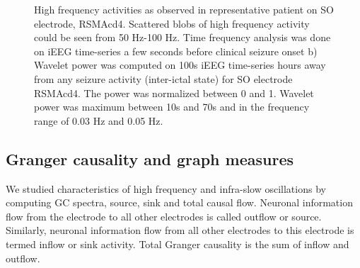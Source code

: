 \begin{figure}%
    \caption{High frequency activities as observed in representative patient on SO electrode, RSMAcd4. Scattered blobs of high frequency activity could be seen from 50 Hz-100 Hz. Time frequency analysis was done on iEEG time-series a few seconds before clinical seizure onset b) Wavelet power was computed on 100s iEEG time-series hours away from any seizure activity (inter-ictal state) for SO electrode RSMAcd4. The power was normalized between 0 and 1. Wavelet power was maximum between 10s and 70s and in the frequency range of 0.03 Hz and 0.05 Hz.}%
    \label{fig:power_plot}%
\end{figure}



\subsection{Granger causality and graph measures}
We studied characteristics of high frequency and infra-slow oscillations by computing GC spectra, source, sink and total causal flow. Neuronal information flow from the electrode to all other electrodes is called outflow or source. Similarly, neuronal information flow from all other electrodes to this electrode is termed inflow or sink activity. Total Granger causality is the sum of inflow and outflow. 

